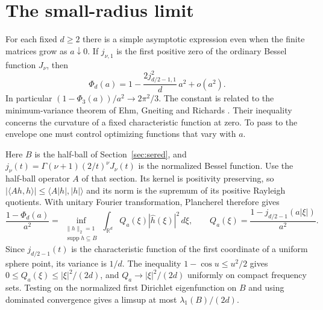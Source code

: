 \documentclass[11pt,a4paper]{article}
\numberwithin{equation}{section}
\begin{document}
\section{The small-radius limit}
\label{sec:smallradius}
For each fixed $d\ge2$ there is a simple asymptotic expression even when the finite matrices grow as $a\downarrow0$. If $j_{\nu,1}$ is the first positive zero of the ordinary Bessel function $J_\nu$, then
\begin{equation}\label{eq:small-radius}
 \Phi_d(a)=1-\frac{2j_{d/2-1,1}^2}{d}\,a^2+o(a^2).
\end{equation}
In particular $(1-\Phi_3(a))/a^2\to2\pi^2/3$. The constant is related to the minimum-variance theorem of Ehm, Gneiting and Richards \cite[Theorem~5.1]{EGR}. Their inequality concerns the curvature of a fixed characteristic function at zero. To pass to the envelope one must control optimizing functions that vary with $a$.

Here $B$ is the half-ball of Section~\ref{sec:sered}, and $j_\nu(t)=\Gamma(\nu+1)(2/t)^\nu J_\nu(t)$ is the normalized Bessel function. Use the half-ball operator $A$ of that section. Its kernel is positivity preserving, so $|\langle Ah,h\rangle|\le\langle A|h|,|h|\rangle$ and its norm is the supremum of its positive Rayleigh quotients. With unitary Fourier transformation, Plancherel therefore gives
\[
 \frac{1-\Phi_d(a)}{a^2}=
 \inf_{\substack{\|h\|_2=1\\\operatorname{supp}h\subseteq B}}
 \int_{\mathbb R^d} Q_a(\xi)|\widehat h(\xi)|^2\,d\xi,
 \qquad Q_a(\xi)=\frac{1-j_{d/2-1}(a|\xi|)}{a^2}.
\]
Since $j_{d/2-1}(t)$ is the characteristic function of the first coordinate of a uniform sphere point, its variance is $1/d$. The inequality $1-\cos u\le u^2/2$ gives $0\le Q_a(\xi)\le |\xi|^2/(2d)$, and $Q_a\to |\xi|^2/(2d)$ uniformly on compact frequency sets. Testing on the normalized first Dirichlet eigenfunction on $B$ and using dominated convergence gives a limsup at most $\lambda_1(B)/(2d)$.
\end{document}
